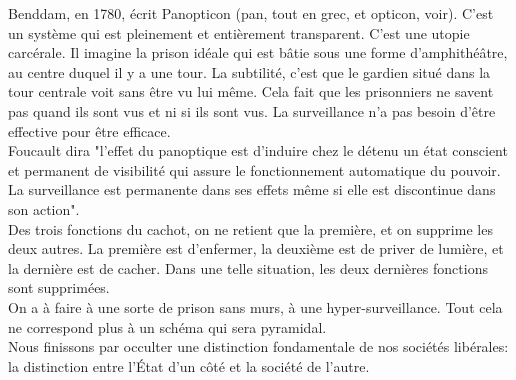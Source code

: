 \documentclass[10pt, a4paper, openany]{book}
\begin{document}
Benddam, en 1780, écrit Panopticon (pan, tout en grec, et opticon, voir). C'est un système qui est pleinement et entièrement transparent. C'est une utopie carcérale. Il imagine la prison idéale qui est bâtie sous une forme d'amphithéâtre, au centre duquel il y a une tour. La subtilité, c'est que le gardien situé dans la tour centrale voit sans être vu lui même. Cela fait que les prisonniers ne savent pas quand ils sont vus et ni si ils sont vus. La surveillance n'a pas besoin d'être effective pour être efficace. \\
Foucault dira "l'effet du panoptique est d'induire chez le détenu un état conscient et permanent de visibilité qui assure le fonctionnement automatique du pouvoir. La surveillance est permanente dans ses effets même si elle est discontinue dans son action". \\
Des trois fonctions du cachot, on ne retient que la première, et on supprime les deux autres. La première est d'enfermer, la deuxième est de priver de lumière, et la dernière est de cacher. Dans une telle situation, les deux dernières fonctions sont supprimées. \\
On a à faire à une sorte de prison sans murs, à une hyper-surveillance. Tout cela ne correspond plus à un schéma qui sera pyramidal. \\
Nous finissons par occulter une distinction fondamentale de nos sociétés libérales: la distinction entre l'État d'un côté et la société de l'autre. 
\end{document}
